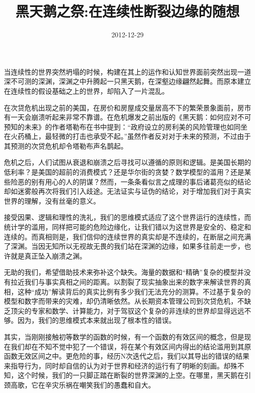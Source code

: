 \documentclass[11pt,a4paper]{article}
\title{}
\date{2012-12-29}
\title{黑天鹅之祭:在连续性断裂边缘的随想}
\begin{document}
\maketitle

\section*{}
\label{sec:orgheadline1}

当连续性的世界突然坍塌的时候，构建在其上的运作和认知世界面前突然出现一道深不可测的深渊，深渊之中升腾起一只黑天鹅，在深壑边缘翩然起舞。而原本建立在连续性的假设基础之上的世界，却陷入了一片混乱。

在次贷危机出现之前的美国，在房价和房屋成交量居高不下的繁荣景象面前，房市有一天会崩溃听起来非常不靠谱。在危机爆发之前出版的《黑天鹅：如何应对不可预知的未来》的作者塔勒布在书中提到：“政府设立的房利美的风险管理也如同坐在火药桶上，最轻微的打击也承受不起。”虽然作者反对对于未来的预测，不过由于其预测的次贷危机却令塔勒布声名鹊起。

危机之后，人们试图从衰退和崩溃之后寻找可以遵循的原则和逻辑。是美国长期的低利率？是美国的超前的消费模式？还是华尔街的贪婪？数学模型的滥用？还是某些险恶的别有用心的人的阴谋？然而，一条条看似言之成理的事后诸葛亮似的结论却如迷雾般再次将我们引入歧途。无法证实与证伪的结论，对于增加我们对于真实世界的理解，没有丝毫的意义。

接受因果、逻辑和理性的洗礼，我们的思维模式适应了这个世界运行的连续性，而统计学的滥用，同样把可能的危险边缘化，让我们错以为这世界是安全的、稳定和连续的。而真相则是，我们信仰的连续世界的真实却是不连续的，在断层之间充满了深渊。当因无知所以无视故无畏的我们站在深渊的边缘，如果多往前走一步，也许就是真正坠入崩溃之渊。

无助的我们，希望借助技术来弥补这个缺失。海量的数据和“精确”复杂的模型并没有拉近我们与事实真相之间的距离。以割裂了现实抽象出来的数字来解读世界的真相，这种“成功”解读背后的真实比例有多少我们无法充分的测算。不过基于复杂的模型和数字而带来的灾难，却仍清晰依然。从长期资本管理公司到次贷危机，不缺乏顶尖的专家和数学、计算能力，对于驾驭这个复杂的非连续的世界却显得远远不够。因为，我们的思维模式本来就出现了根本性的错误。

其实，当刚刚接触初等数学的函数的时候，有一个函数的有效区间的概念，但是现在我们却在不知不觉中犯了一个错误，将在某个有效区间内得出的结论滥用到其原函数无效区间之中。更危险的事，经历N次迭代之后，我们以其导出的错误的结果来指导行为，同时却自信的认为对于世界和经济的运行有了明晰的刻画。却殊不知，这个时候，我们的一只脚正踏在断裂的世界深渊的上空。在哪里，黑天鹅在引颈高歌，它在辛灾乐祸在嘲笑我们的愚蠢和自大。
\end{document}
